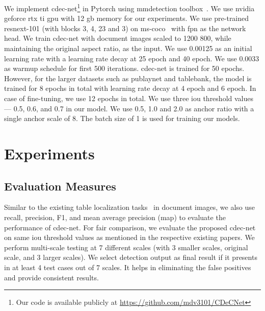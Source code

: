 \documentclass[a4paper,conference]{IEEEtran}
\begin{document}
We implement {\sc cd}e{\sc c-n}et\footnote[2]{Our code is available publicly at \url{https://github.com/mdv3101/CDeCNet}} in Pytorch using {\sc mm}detection toolbox~\cite{mmdetection}. We use {\sc nvidia} {\sc g}e{\sc f}orce {\sc rtx} { t}i {\sc gpu} with 12 {\sc gb} memory for our experiments. We use pre-trained {\sc r}es{\sc n}e{\sc x}t-101 (with blocks 3, 4, 23 and 3) on {\sc ms-coco}~\cite{lin2014microsoft} with {\sc fpn} as the network head. We train {\sc cd}e{\sc c-n}et with document images scaled to 1200  800, while maintaining the original aspect ratio, as the input. We use 0.00125 as an initial learning rate with a learning rate decay at 25 epoch and 40 epoch. We use 0.0033 as warmup schedule for first 500 iterations. {\sc cd}e{\sc c-n}et is trained for 50 epochs. However, for the larger datasets such as {\sc p}ub{\sc l}ay{\sc n}et and {\sc t}able{\sc b}ank, the model is trained for 8 epochs in total with learning rate decay at 4 epoch and 6 epoch. In case of fine-tuning, we use 12 epochs in total. We use three {\sc i}o{\sc u} threshold values --- 0.5, 0.6, and 0.7 in our model. We use 0.5, 1.0 and 2.0 as anchor ratio with a single anchor scale of 8. The batch size of 1 is used for training our models.    

\section{Experiments}

\subsection{Evaluation Measures}

Similar to the existing table localization tasks~\cite{gilani2017table,schreiber2017deepdesrt,siddiqui2018decnt,vo2018ensemble,arif2018table,li2019tablebank,sun2019faster,younas2019ffd,zhong2019publaynet,saha2019graphical,casado2019benefits} in document images, we also use recall, precision, F1, and mean average precision (m{\sc ap}) to evaluate the performance of {\sc cd}e{\sc c-n}et. For fair comparison, we evaluate the proposed {\sc cd}e{\sc c-n}et on same {\sc i}o{\sc u} threshold values as mentioned in the respective existing papers. We perform multi-scale testing at 7 different scales (with 3 smaller scales, original scale, and 3 larger scales). We select detection output as final result if it presents in at least 4 test cases out of 7 scales. It helps in eliminating the false positives and provide consistent results.
\end{document}
